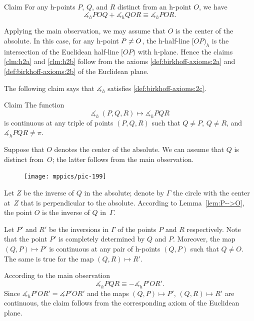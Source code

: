 \begin{thm}{Claim}\label{clm:h2b}
For any h-points $P$, $Q$, and $R$ distinct from an h-point $O$, we have
$$\measuredangle_h P O Q+\measuredangle_h Q O R
\equiv\measuredangle_h P O R.$$

\end{thm}

Applying the main observation, 
we may assume that $O$ is the center of the absolute.
In this case, for any h-point $P\z\ne O$, the h-half-line
$[OP)_h$ is the intersection of the Euclidean half-line $[OP)$ with h-plane.
Hence the claims \ref{clm:h2a} and \ref{clm:h2b} 
follow from the axioms \ref{def:birkhoff-axioms:2a} and \ref{def:birkhoff-axioms:2b} of the Euclidean plane.
\qeds

The following claim says that
$\measuredangle_h$ satisfies
 \ref{def:birkhoff-axioms:2c}.

\begin{thm}{Claim}\label{clm:h2c}
The function 
$$\measuredangle_h\:(P,Q,R)\mapsto\measuredangle_h P Q R$$
is continuous at any triple of points $(P,Q,R)$
such that $Q\ne P$, $Q\ne R$, and $\measuredangle_h P Q R\ne\pi$.
\end{thm}

Suppose that $O$ denotes the center of the absolute.
We can assume that $Q$ is distinct from~$O$;
the latter follows from the main observation.

\begin{figure}
\vskip-4mm
\centering
\texttt{[image: mppics/pic-199]}
\end{figure}

Let $Z$ be the inverse of $Q$ in the absolute;
denote by $\Gamma$ the circle with the center at~$Z$ that is perpendicular to the absolute.
According to Lemma~\ref{lem:P-->O},
the point $O$ is the inverse of $Q$ in~$\Gamma$.

Let $P'$ and $R'$ be the inversions in $\Gamma$ of the points $P$ and $R$ respectively.
Note that the point $P'$ is completely determined by $Q$ and $P$.
Moreover, the map $(Q,P)\mapsto P'$ is continuous at any pair of h-points $(Q,P)$ such that $Q\ne O$.
The same is true for the map $(Q,R)\mapsto R'$.

According to the main observation 
$$\measuredangle_h P Q R\equiv -\measuredangle_h P' O R'.$$
Since $\measuredangle_h P' O R'=\measuredangle P' O R'$ and 
the maps $(Q,P)\mapsto P'$, $(Q,R)\mapsto R'$ are continuous,
the claim follows from the corresponding axiom of the Euclidean plane.
\qeds

